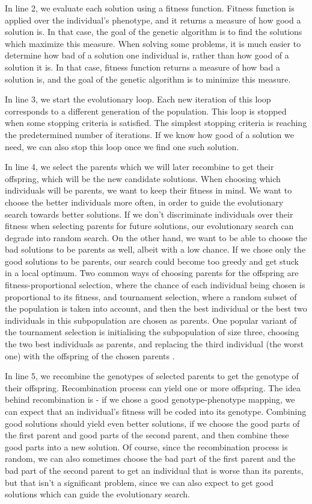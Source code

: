 In line 2, we evaluate each solution using a fitness function. Fitness function is applied over the individual's phenotype, and it returns a measure of how good a solution is. In that case, the goal of the genetic algorithm is to find the solutions which maximize this measure. When solving some problems, it is much easier to determine how bad of a solution one individual is, rather than how good of a solution it is. In that case, fitness function returns a measure of how bad a solution is, and the goal of the genetic algorithm is to minimize this measure.

In line 3, we start the evolutionary loop. Each new iteration of this loop corresponds to a different generation of the population. This loop is stopped when some stopping criteria is satisfied. The simplest stopping criteria is reaching the predetermined number of iterations. If we know how good of a solution we need, we can also stop this loop once we find one such solution.  

In line 4, we select the parents which we will later recombine to get their offspring, which will be the new candidate solutions. When choosing which individuals will be parents, we want to keep their fitness in mind. We want to choose the better individuals more often, in order to guide the evolutionary search towards better solutions. If we don't discriminate individuals over their fitness when selecting parents for future solutions, our evolutionary search can degrade into random search. On the other hand, we want to be able to choose the bad solutions to be parents as well, albeit with a low chance. If we chose only the good solutions to be parents, our search could become too greedy and get stuck in a local optimum. Two common ways of choosing parents for the offspring are fitness-proportional selection, where the chance of each individual being chosen is proportional to its fitness, and tournament selection, where a random subset of the population is taken into account, and then the best individual or the best two individuals in this subpopulation are chosen as parents. One popular variant of the tournament selection is initialising the subpopulation of size three, choosing the two best individuals as parents, and replacing the third individual (the worst one) with the offspring of the chosen parents \citep{cupic2019evolucijskoracunarstvo}.

In line 5, we recombine the genotypes of selected parents to get the genotype of their offspring. Recombination process can yield one or more offspring. The idea behind recombination is - if we chose a good genotype-phenotype mapping, we can expect that an individual's fitness will be coded into its genotype. Combining good solutions should yield even better solutions, if we choose the good parts of the first parent and good parts of the second parent, and then combine these good parts into a new solution. Of course, since the recombination process is random, we can also sometimes choose the bad part of the first parent and the bad part of the second parent to get an individual that is worse than its parents, but that isn't a significant problem, since we can also expect to get good solutions which can guide the evolutionary search.

